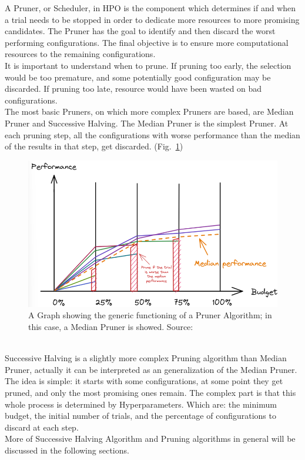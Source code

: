 A Pruner, or Scheduler, in HPO is the component which determines if and when a trial needs to be stopped in order to dedicate more resources to more promising candidates.
The Pruner has the goal to identify and then discard the worst performing configurations.
The final objective is to ensure more computational resources to the remaining configurations.
\\[0.3cm]It is important to understand when to prune. If pruning too early, the selection would be too premature, and some potentially good configuration may be discarded. If pruning too late, resource would have been wasted on bad configurations.
\\[0.3cm]The most basic Pruners, on which more complex Pruners are based, are Median Pruner and Successive Halving.
The Median Pruner is the simplest Pruner. At each pruning step, all the configurations with worse performance than the median of the results in that step, get discarded. (Fig.~\ref{fig:figure-2.1.2})
\begin{figure}[t]
	\centering
	\includegraphics[width=12cm]{figures/figure-2.1.2.png}
	\caption[Pruning Algorithm]{A Graph showing the generic functioning of a Pruner Algorithm; in this case, a Median Pruner is showed. Source:~\cite{Tesi-1.3}}
	\label{fig:figure-2.1.2}
\end{figure}
\\[0.3cm]Successive Halving is a slightly more complex Pruning algorithm than Median Pruner, actually it can be interpreted as an generalization of the Median Pruner. The idea is simple: it starts with some configurations, at some point they get pruned, and only the most promising ones remain. The complex part is that this whole process is determined by Hyperparameters. Which are: the minimum budget, the initial number of trials, and the percentage of configurations to discard at each step.
\\More of Successive Halving Algorithm and Pruning algorithms in general will be discussed in the following sections.


